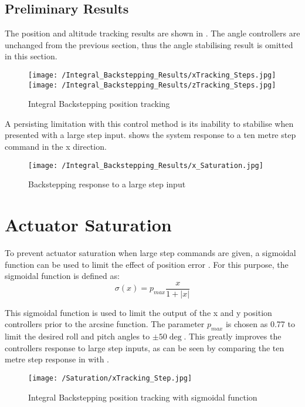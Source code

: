 \FloatBarrier
\subsection{Preliminary Results}
The position and altitude tracking results are shown in . The angle controllers are unchanged from the previous section, thus the angle stabilising result is omitted in this section.

\begin{figure}[htb]
\begin{center}
	\texttt{[image: /Integral\_Backstepping\_Results/xTracking\_Steps.jpg]}%
	\texttt{[image: /Integral\_Backstepping\_Results/zTracking\_Steps.jpg]}%
	\end{center}
	\caption{Integral Backstepping position tracking}%
	\label{fig:IntBackPos}%
\end{figure}

A persisting limitation with this control method is its inability to stabilise when presented with a large step input.  shows the system response to a ten metre step command in the x direction.

\begin{figure}[htb]
\begin{center}
	\texttt{[image: /Integral\_Backstepping\_Results/x\_Saturation.jpg]}%
	\end{center}
	\caption{Backstepping response to a large step input}%
	\label{fig:IntBackSat}%
\end{figure}
\FloatBarrier
\section{Actuator Saturation}
To prevent actuator saturation when large step commands are given, a sigmoidal function can be used to limit the effect of position error \cite{Cabecinhas2009}. For this purpose, the sigmoidal function is defined as:
\[\sigma(x)=p_{max}\frac{x}{1+|x|}\]

This sigmoidal function is used to limit the output of the x and y position controllers prior to the arcsine function. The parameter $p_{max}$ is chosen as 0.77 to limit the desired roll and pitch angles to $\pm50\deg$.
This greatly improves the controllers response to large step inputs, as can be seen by comparing the ten metre step response in  with .

\begin{figure}[htb]
\begin{center}
	\texttt{[image: /Saturation/xTracking\_Step.jpg]}%
	\end{center}
	\caption{Integral Backstepping position tracking with sigmoidal function}%
	\label{fig:SatStep}%
\end{figure}


